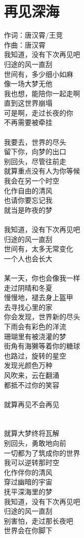 \documentclass[twocolumn]{article}
\begin{document}
\section{再见深海}
\noindent
{
	\kaishu
	作词：唐汉霄/王竞\\
	作曲：唐汉霄\\
}
我知道，没有下次再见吧\\
归途的风一直刮\\
世间有，多少细小如麻\\
像一场大梦无他\\
我也想，能陪你一起走啊\\
直到这世界崩塌\\
可是啊，走过长夜的你\\
不再需要被牵挂\\\\
我要去，世界的尽头\\
留下你，向梦的出口\\
别回头，尽管往前走\\
就算重点没有人为你等候\\
我会在另一个时空\\
化作自由的清风\\
也请你要忘记我\\
就当是昨夜的梦\\
\\我知道，没有下次再见吧\\
归途的风一直刮\\
世间有，太多无常变化\\
一个人也会长大\\
\\某一天，你也会像我一样\\
走过阴晴和冬夏\\
慢慢地，褪去身上盔甲\\
去寻找心里的家\\
你会发现，世界新的尽头\\
下雨会有彩色的洋流\\
珊瑚里有被浇灌的梦\\
街角有海獭等着你的糖球\\
也路过，旋转的星空\\
发现光颜色万种\\
风吹来，云在翻涌\\
都抵不过你的笑容\\
\\就算再见不会再见\\
\\\\
就算大梦终将瓦解\\
别回头，勇敢地向前\\
一切都为了筑成你的世界\\
我可以逆转那时空\\
化作伴你的清风\\
穿过幽暗的宇宙\\
抚平深海里的梦\\
我知道，没有下次再见吧\\
归途的风一直刮\\
别害怕，走过那长夜吧\\
世界会在你脚下
\end{document}
